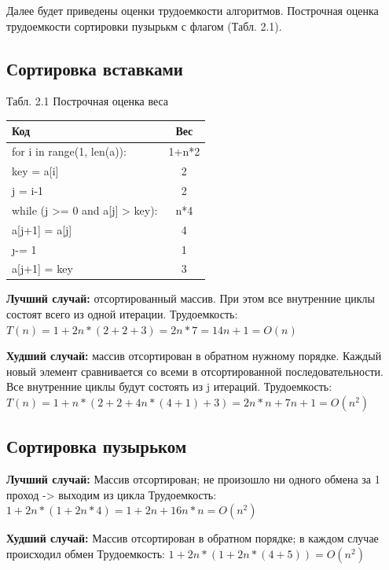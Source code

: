 \documentclass[12pt]{report}
\begin{document}
Далее будет приведены оценки трудоемкости алгоритмов. Построчная оценка трудоемкости сортировки пузырькм с флагом (Табл. 2.1).

\subsection{Сортировка вставками}
\begin{center}
Табл. 2.1 Построчная оценка веса
	\begin{tabular}{|l c|} 
 	\hline
	Код & Вес \\ [0.5ex] 
 	\hline
 	for i in range(1, len(a)): & 1+n*2\\
 	\hline
	key = a[i] & 2\\
	\hline
	j = i-1 & 2\\
	\hline
	while (j >= 0 and a[j] > key): & n*4\\
	\hline
	a[j+1] = a[j] & 4\\
	\hline
	\j -= 1 & 1\\
	\hline
	a[j+1] = key & 3\\
	\hline
	\end{tabular}
\end{center}

\hspace*{5mm}
\textbf{Лучший случай:} отсортированный массив. При этом все внутренние циклы состоят всего из одной итерации.\newline
Трудоемкость: $T(n) = 1 + 2n * (2+2+3)  =  2n * 7 = 14n + 1 = O(n)$

\textbf{Худший случай:} массив отсортирован в обратном нужному порядке. Каждый новый элемент сравнивается со всеми в отсортированной последовательности.
Все внутренние циклы будут состоять из j итераций. \newline
Трудоемкость: $T(n) = 1+n*(2+2+4n*(4+1)+3) = 2n*n+7n+1 =  O(n^{2})$

 \subsection{Сортировка пузырьком}
\textbf{Лучший случай:} Массив отсортирован; не произошло ни одного обмена за 1 проход -> выходим из цикла \newline
Трудоемкость:  $1+2n*(1 + 2n*4) = 1+2n+16n*n=  O(n^{2})$

\textbf{Худший случай:}  Массив отсортирован в обратном порядке; в каждом случае происходил обмен\newline
Трудоемкость: $1+2n*(1 + 2n*(4+5)) = O(n^2)$
\end{document}
